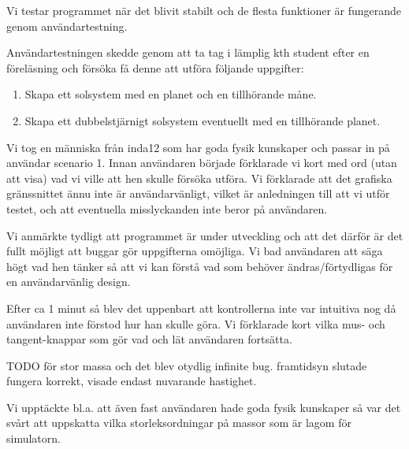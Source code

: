 Vi testar programmet när det blivit stabilt och de flesta funktioner är fungerande genom användartestning.

Användartestningen skedde genom att ta tag i lämplig kth student efter en föreläsning och försöka få denne att utföra följande uppgifter:
\begin{enumerate}
    \item Skapa ett solsystem med en planet och en tillhörande måne.
    \item Skapa ett dubbelstjärnigt solsystem eventuellt med
        en tillhörande planet.
\end{enumerate}

Vi tog en människa från inda12 som har goda fysik kunskaper och passar in på användar scenario 1.
Innan användaren började förklarade vi kort med ord (utan att visa)
vad vi ville att hen skulle försöka utföra.
Vi förklarade att det grafiska gränssnittet ännu inte är användarvänligt,
 vilket är anledningen till att vi utför testet, och att eventuella misslyckanden inte beror på användaren.

Vi anmärkte tydligt att programmet är under utveckling och
att det därför är det fullt möjligt att buggar gör uppgifterna omöjliga.
Vi bad användaren att säga högt vad hen tänker så att vi kan förstå vad som
behöver ändras/förtydligas för en användarvänlig design.

Efter ca 1 minut så blev det uppenbart att kontrollerna inte var intuitiva nog då användaren inte förstod hur han skulle göra. Vi förklarade kort vilka mus- och tangent-knappar som gör vad och lät användaren fortsätta.

TODO
för stor massa och det blev otydlig infinite bug.
framtidsyn slutade fungera korrekt, visade endast nuvarande hastighet.

Vi upptäckte bl.a. att även fast användaren hade goda fysik kunskaper så var det svårt att uppskatta vilka storleksordningar på massor som är lagom för simulatorn. 

